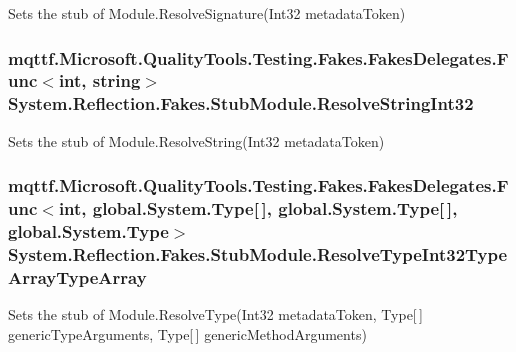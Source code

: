 Sets the stub of Module.\-Resolve\-Signature(\-Int32 metadata\-Token)

\hypertarget{class_system_1_1_reflection_1_1_fakes_1_1_stub_module_a7576ee63c7c8c2e5d0babc869d01547f}{
\subsubsection[{Resolve\-String\-Int32}]{\setlength{\rightskip}{0pt plus 5cm}mqttf.\-Microsoft.\-Quality\-Tools.\-Testing.\-Fakes.\-Fakes\-Delegates.\-Func$<$int, string$>$ System.\-Reflection.\-Fakes.\-Stub\-Module.\-Resolve\-String\-Int32}}\label{class_system_1_1_reflection_1_1_fakes_1_1_stub_module_a7576ee63c7c8c2e5d0babc869d01547f}


Sets the stub of Module.\-Resolve\-String(\-Int32 metadata\-Token)

\hypertarget{class_system_1_1_reflection_1_1_fakes_1_1_stub_module_a56c25531d3068b2e4d8709531fd6e58e}{
\subsubsection[{Resolve\-Type\-Int32\-Type\-Array\-Type\-Array}]{\setlength{\rightskip}{0pt plus 5cm}mqttf.\-Microsoft.\-Quality\-Tools.\-Testing.\-Fakes.\-Fakes\-Delegates.\-Func$<$int, global.\-System.\-Type\mbox{[}$\,$\mbox{]}, global.\-System.\-Type\mbox{[}$\,$\mbox{]}, global.\-System.\-Type$>$ System.\-Reflection.\-Fakes.\-Stub\-Module.\-Resolve\-Type\-Int32\-Type\-Array\-Type\-Array}}\label{class_system_1_1_reflection_1_1_fakes_1_1_stub_module_a56c25531d3068b2e4d8709531fd6e58e}


Sets the stub of Module.\-Resolve\-Type(\-Int32 metadata\-Token, Type\mbox{[}$\,$\mbox{]} generic\-Type\-Arguments, Type\mbox{[}$\,$\mbox{]} generic\-Method\-Arguments)

